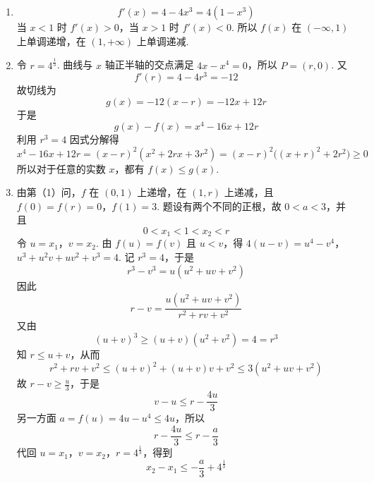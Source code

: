\begin{solution}
\begin{enumerate}
\item
\[
f'(x)=4-4x^3=4(1-x^3)
\]
当 \(x<1\) 时 \(f'(x)>0\)，当 \(x>1\) 时 \(f'(x)<0\). 所以 \(f(x)\) 在 \((-\infty,1)\) 上单调递增，在 \((1,+\infty)\) 上单调递减.

\item 令 \(r=4^{\frac{1}{3}}\). 曲线与 \(x\) 轴正半轴的交点满足 \(4x-x^4=0\)，所以 \(P=(r,0)\). 又
\[
f'(r)=4-4r^3=-12
\]
故切线为
\[
g(x)=-12(x-r)=-12x+12r
\]
于是
\[
g(x)-f(x)=x^4-16x+12r
\]
利用 \(r^3=4\) 因式分解得
\[
x^4-16x+12r=(x-r)^2(x^2+2rx+3r^2)
=(x-r)^2\bigl((x+r)^2+2r^2\bigr)\geqslant0
\]
所以对于任意的实数 \(x\)，都有 \(f(x)\leqslant g(x)\).

\item 由第（1）问，\(f\) 在 \((0,1)\) 上递增，在 \((1,r)\) 上递减，且 \(f(0)=f(r)=0\)，\(f(1)=3\). 题设有两个不同的正根，故 \(0<a<3\)，并且
\[
0<x_1<1<x_2<r
\]
令 \(u=x_1\)，\(v=x_2\). 由 \(f(u)=f(v)\) 且 \(u<v\)，得
\(4(u-v)=u^4-v^4\)，\(u^3+u^2v+uv^2+v^3=4\).
记 \(r^3=4\)，于是
\[
r^3-v^3=u(u^2+uv+v^2)
\]
因此
\[
r-v=\frac{u(u^2+uv+v^2)}{r^2+rv+v^2}
\]
又由
\[
(u+v)^3\geqslant(u+v)(u^2+v^2)=4=r^3
\]
知 \(r\leqslant u+v\)，从而
\[
r^2+rv+v^2\leqslant(u+v)^2+(u+v)v+v^2
\leqslant3(u^2+uv+v^2)
\]
故 \(r-v\geqslant \frac{u}{3}\)，于是
\[
v-u\leqslant r-\frac{4u}{3}
\]
另一方面 \(a=f(u)=4u-u^4\leqslant4u\)，所以
\[
r-\frac{4u}{3}\leqslant r-\frac a3
\]
代回 \(u=x_1\)，\(v=x_2\)，\(r=4^{\frac{1}{3}}\)，得到
\[
x_2-x_1\leqslant-\frac a3+4^{\frac{1}{3}}
\]
\end{enumerate}
\end{solution}
